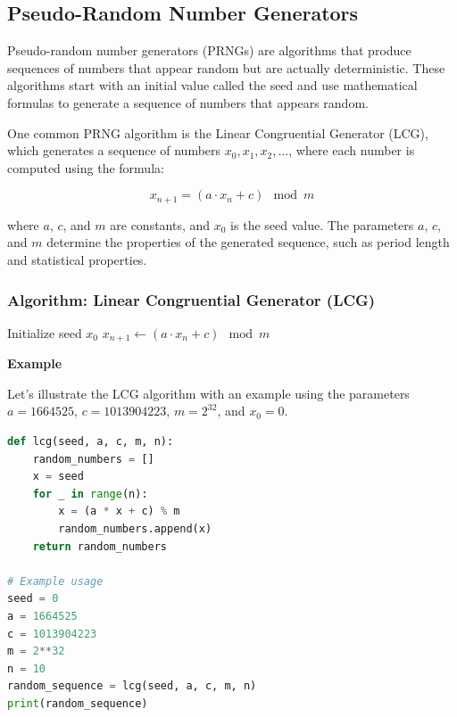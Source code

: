 \documentclass[12pt]{book} %
\begin{document}
\subsection{Pseudo-Random Number Generators}

Pseudo-random number generators (PRNGs) are algorithms that produce sequences of numbers that appear random but are actually deterministic. These algorithms start with an initial value called the seed and use mathematical formulas to generate a sequence of numbers that appears random.

One common PRNG algorithm is the Linear Congruential Generator (LCG), which generates a sequence of numbers \(x_0, x_1, x_2, ...\), where each number is computed using the formula:

\[x_{n+1} = (a \cdot x_n + c) \mod m\]

where \(a\), \(c\), and \(m\) are constants, and \(x_0\) is the seed value. The parameters \(a\), \(c\), and \(m\) determine the properties of the generated sequence, such as period length and statistical properties.

\subsubsection{Algorithm: Linear Congruential Generator (LCG)}
\FloatBarrier
\begin{algorithm}
\caption{Linear Congruential Generator (LCG)}
\begin{algorithmic}
\State Initialize seed \(x_0\)
    \State $x_{n+1} \leftarrow (a \cdot x_n + c) \mod m$
\EndFor
\end{algorithmic}
\end{algorithm}
\FloatBarrier

\textbf{Example}

Let's illustrate the LCG algorithm with an example using the parameters \(a = 1664525\), \(c = 1013904223\), \(m = 2^{32}\), and \(x_0 = 0\).

\FloatBarrier
\begin{lstlisting}[language=Python]
def lcg(seed, a, c, m, n):
    random_numbers = []
    x = seed
    for _ in range(n):
        x = (a * x + c) % m
        random_numbers.append(x)
    return random_numbers

# Example usage
seed = 0
a = 1664525
c = 1013904223
m = 2**32
n = 10
random_sequence = lcg(seed, a, c, m, n)
print(random_sequence)
\end{lstlisting}
\FloatBarrier
\end{document}
